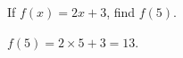 \question If $f(x) = 2x + 3$, find $f(5)$.
\begin{solution}
$f(5) = 2 \times 5 + 3 = 13$.
\end{solution}
